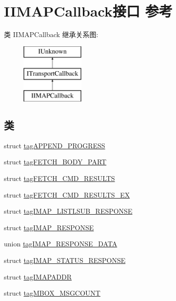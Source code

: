 \hypertarget{interface_i_i_m_a_p_callback}{}\section{I\+I\+M\+A\+P\+Callback接口 参考}
\label{interface_i_i_m_a_p_callback}
类 I\+I\+M\+A\+P\+Callback 继承关系图\+:\begin{figure}[H]
\begin{center}
\leavevmode
\includegraphics[height=3.000000cm]{interface_i_i_m_a_p_callback}
\end{center}
\end{figure}
\subsection*{类}
\begin{DoxyCompactItemize}
\item 
struct \hyperlink{struct_i_i_m_a_p_callback_1_1tag_a_p_p_e_n_d___p_r_o_g_r_e_s_s}{tag\+A\+P\+P\+E\+N\+D\+\_\+\+P\+R\+O\+G\+R\+E\+SS}
\item 
struct \hyperlink{struct_i_i_m_a_p_callback_1_1tag_f_e_t_c_h___b_o_d_y___p_a_r_t}{tag\+F\+E\+T\+C\+H\+\_\+\+B\+O\+D\+Y\+\_\+\+P\+A\+RT}
\item 
struct \hyperlink{struct_i_i_m_a_p_callback_1_1tag_f_e_t_c_h___c_m_d___r_e_s_u_l_t_s}{tag\+F\+E\+T\+C\+H\+\_\+\+C\+M\+D\+\_\+\+R\+E\+S\+U\+L\+TS}
\item 
struct \hyperlink{struct_i_i_m_a_p_callback_1_1tag_f_e_t_c_h___c_m_d___r_e_s_u_l_t_s___e_x}{tag\+F\+E\+T\+C\+H\+\_\+\+C\+M\+D\+\_\+\+R\+E\+S\+U\+L\+T\+S\+\_\+\+EX}
\item 
struct \hyperlink{struct_i_i_m_a_p_callback_1_1tag_i_m_a_p___l_i_s_t_l_s_u_b___r_e_s_p_o_n_s_e}{tag\+I\+M\+A\+P\+\_\+\+L\+I\+S\+T\+L\+S\+U\+B\+\_\+\+R\+E\+S\+P\+O\+N\+SE}
\item 
struct \hyperlink{struct_i_i_m_a_p_callback_1_1tag_i_m_a_p___r_e_s_p_o_n_s_e}{tag\+I\+M\+A\+P\+\_\+\+R\+E\+S\+P\+O\+N\+SE}
\item 
union \hyperlink{union_i_i_m_a_p_callback_1_1tag_i_m_a_p___r_e_s_p_o_n_s_e___d_a_t_a}{tag\+I\+M\+A\+P\+\_\+\+R\+E\+S\+P\+O\+N\+S\+E\+\_\+\+D\+A\+TA}
\item 
struct \hyperlink{struct_i_i_m_a_p_callback_1_1tag_i_m_a_p___s_t_a_t_u_s___r_e_s_p_o_n_s_e}{tag\+I\+M\+A\+P\+\_\+\+S\+T\+A\+T\+U\+S\+\_\+\+R\+E\+S\+P\+O\+N\+SE}
\item 
struct \hyperlink{struct_i_i_m_a_p_callback_1_1tag_i_m_a_p_a_d_d_r}{tag\+I\+M\+A\+P\+A\+D\+DR}
\item 
struct \hyperlink{struct_i_i_m_a_p_callback_1_1tag_m_b_o_x___m_s_g_c_o_u_n_t}{tag\+M\+B\+O\+X\+\_\+\+M\+S\+G\+C\+O\+U\+NT}
\end{DoxyCompactItemize}
